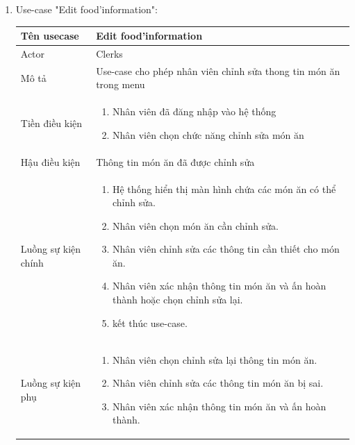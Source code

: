 \begin{enumerate}
    \newpage
    \item Use-case "Edit food'information":
    \begin{center}{\color{black}}
        \begin{tabular}{|p{5cm}|p{7cm}|} \hline
            Tên usecase &   Edit food'information\\ \hline
            Actor& Clerks \\ \hline
            Mô tả& Use-case cho phép nhân viên chỉnh sửa thong tin món ăn trong menu \\ \hline
            Tiền điều kiện &
            \begin{enumerate}[1.]
                \item Nhân viên đã đăng nhập vào hệ thống
                \item Nhân viên chọn chức năng chỉnh sửa món ăn
            \end{enumerate}\\ \hline
            Hậu điều kiện & Thông tin món ăn đã được chỉnh sửa\\ \hline
            Luồng sự kiện chính &  
                \begin{enumerate}[1.]
                    \item Hệ thống hiển thị màn hình chứa các món ăn có thể chỉnh sửa.
                    \item Nhân viên chọn món ăn cần chỉnh sửa.
                    \item Nhân viên chỉnh sửa các thông tin cần thiết cho món ăn.
                    \item Nhân viên xác nhận thông tin món ăn và ấn hoàn thành hoặc chọn chỉnh sửa lại.
    				\item kết thúc use-case.
                \end{enumerate} \\\hline
            Luồng sự kiện phụ &
            \begin{enumerate}[1.]
                \item Nhân viên chọn chỉnh sửa lại thông tin món ăn.
                \item Nhân viên chỉnh sửa các thông tin món ăn bị sai.
                \item Nhân viên xác nhận thông tin món ăn và ấn hoàn thành.
            \end{enumerate}\\ \hline
        \end{tabular}
    \end{center}
    

\end{enumerate}
